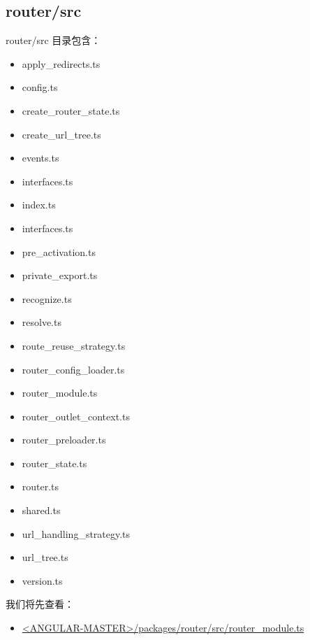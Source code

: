 \subsection{router/src}


router/src 目录包含：

\begin{itemize}
  \item apply\_redirects.ts
  \item config.ts
  \item create\_router\_state.ts
  \item create\_url\_tree.ts
  \item events.ts
  \item interfaces.ts
  \item index.ts
  \item interfaces.ts
  \item pre\_activation.ts
  \item private\_export.ts
  \item recognize.ts
  \item resolve.ts
  \item route\_reuse\_strategy.ts
  \item router\_config\_loader.ts
  \item router\_module.ts
  \item router\_outlet\_context.ts
  \item router\_preloader.ts
  \item router\_state.ts
  \item router.ts
  \item shared.ts
  \item url\_handling\_strategy.ts
  \item url\_tree.ts
  \item version.ts
\end{itemize}


我们将先查看：

\begin{itemize}
  \item \href{https://github.com/angular/angular/blob/master/packages/router/src/router_module.ts}
        {<ANGULAR-MASTER>/packages/router/src/router\_module.ts}
\end{itemize}

